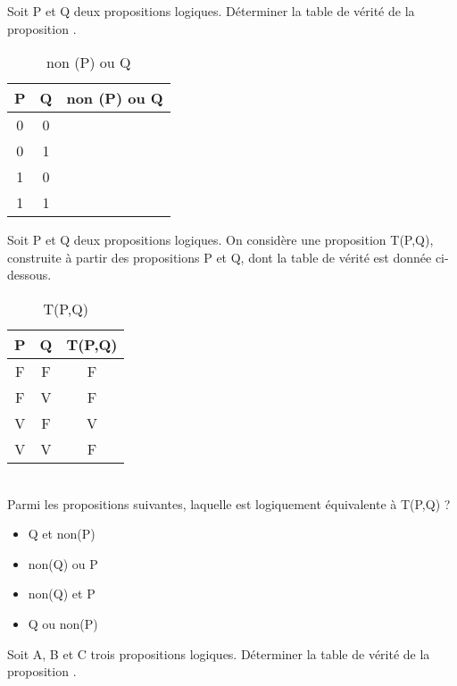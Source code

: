 \documentclass[a4paper,11pt]{article}
\begin{document}
\begin{Form}
\begin{exo}
Soit P et Q deux propositions logiques. Déterminer la table de vérité de la proposition .
\begin{table}[!h]
\begin{center}
\begin{tabular}{|c|c|c|}
\hline 
P & Q & non (P) ou Q \\ 
\hline 
0 & 0 &  \\ 
\hline 
0 & 1 & \\ 
\hline 
1 & 0 & \\
\hline 
1 & 1 & \\
\hline 
\end{tabular}
\caption{\label{ex1}non (P) ou Q}
\end{center}
\end{table} 
\end{exo}
\begin{exo}
Soit P et Q deux propositions logiques. On considère une proposition T(P,Q), construite à partir des propositions P et Q, dont la table de vérité est donnée ci-dessous. 
\begin{table}[!h]
\begin{center}
\begin{tabular}{|c|c|c|}
\hline 
P & Q & T(P,Q) \\ 
\hline 
F & F & F \\ 
\hline 
F & V & F \\ 
\hline 
V & F & V \\
\hline 
V & V & F \\
\hline 
\end{tabular}
\caption{\label{ex2}T(P,Q)}
\end{center}
\end{table} 
\\Parmi les propositions suivantes, laquelle est logiquement équivalente à T(P,Q) ?
\begin{itemize}
\item Q et non(P)
\item non(Q) ou P
\item non(Q) et P
\item Q ou non(P)
\end{itemize}
\end{exo}
\begin{exo}
Soit A, B et C trois propositions logiques. Déterminer la table de vérité de la proposition .
\begin{table}[!h]

\end{table}
\end{exo}
\end{Form}
\end{document}
